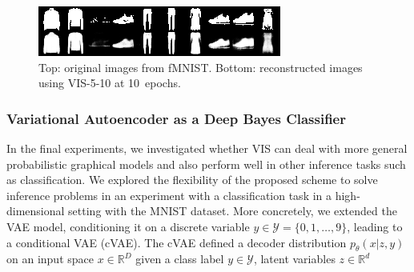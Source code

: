 \unskip
\begin{figure}[h]

\includegraphics[width=\linewidth]{img/reconstruction_mnist_gauss8_5_10_0_.png}

  \caption{Top: original images from fMNIST. Bottom: reconstructed images using VIS-5-10 at 10~epochs.}\label{fig:reco2}
\end{figure}

\subsubsection*{Variational Autoencoder as a Deep Bayes Classifier}\label{sec:exp}
In the final experiments, we investigated whether VIS can deal with more general probabilistic graphical models and also perform well in other inference tasks such as classification.
We explored the flexibility of the proposed scheme to solve inference problems in an experiment with a classification task in a high-dimensional setting %
with the MNIST dataset.
More concretely, we extended the VAE model, conditioning it on a discrete variable $y \in \mathcal{Y} = \lbrace 0, 1, \ldots, 9 \rbrace$, leading to a conditional VAE (cVAE). The cVAE defined a decoder distribution $p_\theta(x | z, y)$ on an input space $x \in \mathbb{R}^D$ given a class label $y \in \mathcal{Y}$, latent variables $z \in \mathbb{R}^d$ 


